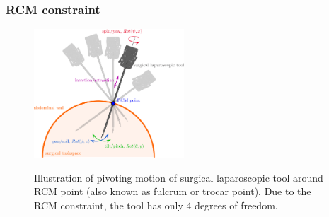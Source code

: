 \begin{frame}
\frametitle{RCM constraint}
\begin{center}
\begin{figure}[H]
\centering
\includegraphics[width=0.5\textwidth]{../images/rcm-surgical-tool.png}\\
\caption{Illustration of pivoting motion of surgical laparoscopic tool around RCM point (also known as fulcrum or trocar point). Due to the RCM constraint, the tool has only 4 degrees of freedom.}
\end{figure}
\end{center}
\end{frame}

